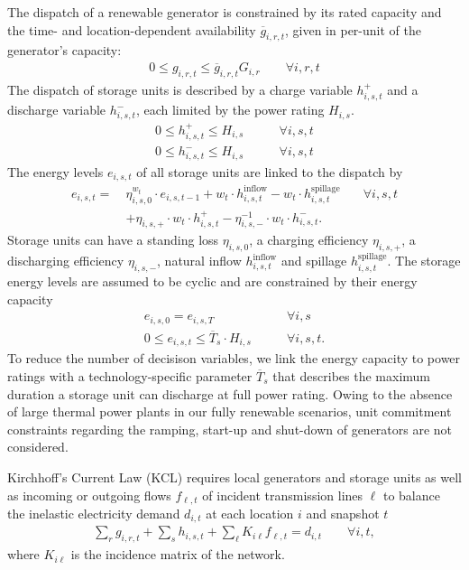 The dispatch of a renewable generator is constrained by
its rated capacity and the time- and location-dependent availability $\overline{g}_{i,r,t}$,
given in per-unit of the generator's capacity:
\begin{align}
    0 \leq g_{i,r,t} \leq \overline{g}_{i,r,t} G_{i,r} \qquad\forall i, r, t
\end{align}
The dispatch of storage units is described by a charge variable $h_{i,s,t}^+$
and a discharge variable $h_{i,s,t}^-$, each limited by the power rating $H_{i,s}$.
\begin{align}
    0 \leq h_{i,s,t}^+ \leq H_{i,s} &\qquad\forall i, s, t \\
    0 \leq h_{i,s,t}^- \leq H_{i,s} &\qquad\forall i, s, t
\end{align}
The energy levels $e_{i,s,t}$ of all storage units are linked to the dispatch by
\begin{align}
    e_{i,s,t} =\: & \eta_{i,s,0}^{w_t} \cdot e_{i,s,t-1} + w_t \cdot h_{i,s,t}^\text{inflow} - w_t \cdot h_{i,s,t}^\text{spillage} & \quad\forall i, s, t \nonumber \\
    & + \eta_{i,s,+} \cdot w_t \cdot h_{i,s,t}^+ - \eta_{i,s,-}^{-1} \cdot w_t \cdot h_{i,s,t}^-.
\end{align}
Storage units can have a standing loss $\eta_{i,s,0}$, a charging efficiency $\eta_{i,s,+}$, a discharging efficiency $\eta_{i,s,-}$,
natural inflow $h_{i,s,t}^\text{inflow}$ and spillage $h_{i,s,t}^\text{spillage}$.
The storage energy levels are assumed to be cyclic and are constrained by their energy capacity
\begin{align}
    e_{i,s,0} = e_{i,s,T} &\qquad\forall i, s \\
    0 \leq e_{i,s,t} \leq \overline{T}_s \cdot H_{i,s} &\qquad\forall i, s, t.
\end{align}
To reduce the number of decisison variables, we link the energy capacity to
power ratings with a technology-specific parameter $\overline{T}_s$ that
describes the maximum duration a storage unit can discharge at full power
rating. Owing to the absence of large thermal power plants in our fully
renewable scenarios, unit commitment constraints regarding the ramping, start-up
and shut-down of generators are not considered.

Kirchhoff's Current Law (KCL) requires local generators and storage units as well as
incoming or outgoing flows $f_{\ell,t}$ of incident transmission lines $\ell$
to balance the inelastic electricity demand $d_{i,t}$ at each location $i$ and snapshot $t$
\begin{align}
    \sum_r g_{i,r,t} + \sum_s h_{i,s,t} + \sum_\ell K_{i\ell} f_{\ell,t} = d_{i,t} \qquad\forall i,t,
\end{align}
where $K_{i\ell}$ is the incidence matrix of the network.


